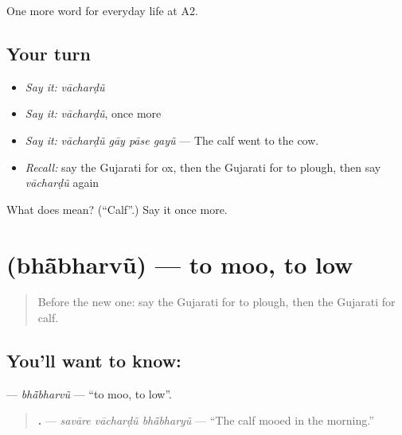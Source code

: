 \begin{grammarlens}[title={What you've built}]
One more word for everyday life at A2.
\end{grammarlens}

\subsection*{Your turn}
\begin{itemize}
\raggedright
  \item \emph{Say it:} \emph{vācharḍũ}
  \item \emph{Say it:} \emph{vācharḍũ}, once more
  \item \emph{Say it:} \emph{vācharḍũ gāy pāse gayũ} — The calf went to the cow.
  \item \emph{Recall:} say the Gujarati for ox, then the Gujarati for to plough, then say \emph{vācharḍũ} again
\end{itemize}

\begin{tcolorbox}[breakable,colback=teal!4,colframe=teal!35!black,title={Before you move on}]
What does  mean? (\textquotedblleft{}Calf\textquotedblright{}.) Say it once more.
\end{tcolorbox}
\section[\texorpdfstring{\gu{ભાંભરવું} (bhā̃bharvũ)}{ભાંભરવું (bhā̃bharvũ)}]{ (bhā̃bharvũ) — to moo, to low}

\label{lesson:GU-C234-bhabharvu}



\begin{quote}
Before the new one: say the Gujarati for to plough, then the Gujarati for calf.
\end{quote}

\subsection*{You'll want to know: }
\textbf{} — \emph{bhā̃bharvũ} — \textquotedblleft{}to moo, to low\textquotedblright{}.

\begin{quote}
\textbf{  .} — \emph{savāre vācharḍũ bhā̃bharyũ} — \textquotedblleft{}The calf mooed in the morning.\textquotedblright{}
\end{quote}

